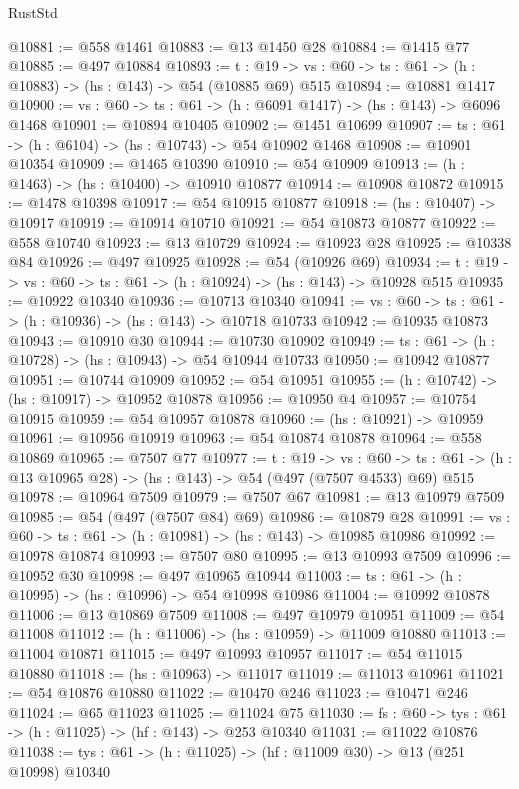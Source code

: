 \begin{lexlean}{RustStd}
\begin{coremodule}
@10881 := @558 @1461
@10883 := @13 @1450 @28
@10884 := @1415 @77
@10885 := @497 @10884
@10893 := {t : @19} ->
  {vs : @60} -> {ts : @61} -> (h : @10883) -> (hs : @143) -> @54 (@10885 @69) @515
@10894 := @10881 @1417
@10900 := {vs : @60} -> {ts : @61} -> (h : @6091 @1417) -> (hs : @143) -> @6096 @1468
@10901 := @10894 @10405
@10902 := @1451 @10699
@10907 := {ts : @61} -> (h : @6104) -> (hs : @10743) -> @54 @10902 @1468
@10908 := @10901 @10354
@10909 := @1465 @10390
@10910 := @54 @10909
@10913 := (h : @1463) -> (hs : @10400) -> @10910 @10877
@10914 := @10908 @10872
@10915 := @1478 @10398
@10917 := @54 @10915 @10877
@10918 := (hs : @10407) -> @10917
@10919 := @10914 @10710
@10921 := @54 @10873 @10877
@10922 := @558 @10740
@10923 := @13 @10729
@10924 := @10923 @28
@10925 := @10338 @84
@10926 := @497 @10925
@10928 := @54 (@10926 @69)
@10934 := {t : @19} -> {vs : @60} -> {ts : @61} -> (h : @10924) -> (hs : @143) -> @10928 @515
@10935 := @10922 @10340
@10936 := @10713 @10340
@10941 := {vs : @60} -> {ts : @61} -> (h : @10936) -> (hs : @143) -> @10718 @10733
@10942 := @10935 @10873
@10943 := @10910 @30
@10944 := @10730 @10902
@10949 := {ts : @61} -> (h : @10728) -> (hs : @10943) -> @54 @10944 @10733
@10950 := @10942 @10877
@10951 := @10744 @10909
@10952 := @54 @10951
@10955 := (h : @10742) -> (hs : @10917) -> @10952 @10878
@10956 := @10950 @4
@10957 := @10754 @10915
@10959 := @54 @10957 @10878
@10960 := (hs : @10921) -> @10959
@10961 := @10956 @10919
@10963 := @54 @10874 @10878
@10964 := @558 @10869
@10965 := @7507 @77
@10977 := {t : @19} ->
  {vs : @60} ->
  {ts : @61} -> (h : @13 @10965 @28) -> (hs : @143) -> @54 (@497 (@7507 @4533) @69) @515
@10978 := @10964 @7509
@10979 := @7507 @67
@10981 := @13 @10979 @7509
@10985 := @54 (@497 (@7507 @84) @69)
@10986 := @10879 @28
@10991 := {vs : @60} -> {ts : @61} -> (h : @10981) -> (hs : @143) -> @10985 @10986
@10992 := @10978 @10874
@10993 := @7507 @80
@10995 := @13 @10993 @7509
@10996 := @10952 @30
@10998 := @497 @10965 @10944
@11003 := {ts : @61} -> (h : @10995) -> (hs : @10996) -> @54 @10998 @10986
@11004 := @10992 @10878
@11006 := @13 @10869 @7509
@11008 := @497 @10979 @10951
@11009 := @54 @11008
@11012 := (h : @11006) -> (hs : @10959) -> @11009 @10880
@11013 := @11004 @10871
@11015 := @497 @10993 @10957
@11017 := @54 @11015 @10880
@11018 := (hs : @10963) -> @11017
@11019 := @11013 @10961
@11021 := @54 @10876 @10880
@11022 := @10470 @246
@11023 := @10471 @246
@11024 := @65 @11023
@11025 := @11024 @75
@11030 := {fs : @60} -> {tys : @61} -> (h : @11025) -> (hf : @143) -> @253 @10340
@11031 := @11022 @10876
@11038 := {tys : @61} -> (h : @11025) -> (hf : @11009 @30) -> @13 (@251 @10998) @10340

\end{coremodule}
\end{lexlean}
